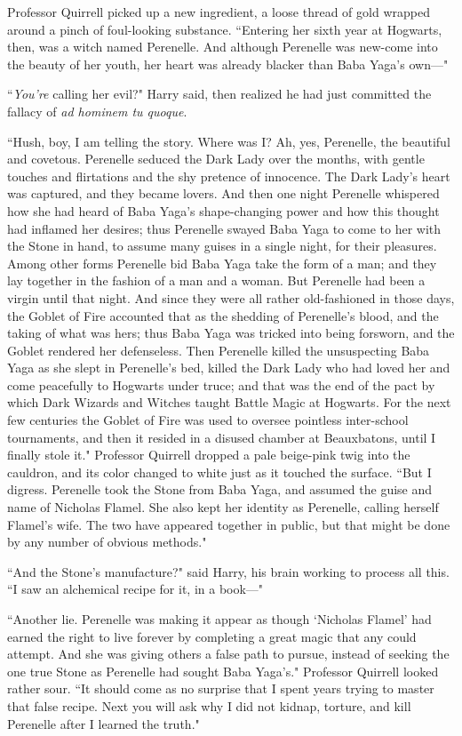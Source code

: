 Professor Quirrell picked up a new ingredient, a loose thread of gold wrapped around a pinch of foul-looking substance. ``Entering her sixth year at Hogwarts, then, was a witch named Perenelle. And although Perenelle was new-come into the beauty of her youth, her heart was already blacker than Baba Yaga's own—"

``\emph{You're} calling her evil?" Harry said, then realized he had just committed the fallacy of \emph{ad hominem tu quoque}.

``Hush, boy, I am telling the story. Where was I? Ah, yes, Perenelle, the beautiful and covetous. Perenelle seduced the Dark Lady over the months, with gentle touches and flirtations and the shy pretence of innocence. The Dark Lady's heart was captured, and they became lovers. And then one night Perenelle whispered how she had heard of Baba Yaga's shape-changing power and how this thought had inflamed her desires; thus Perenelle swayed Baba Yaga to come to her with the Stone in hand, to assume many guises in a single night, for their pleasures. Among other forms Perenelle bid Baba Yaga take the form of a man; and they lay together in the fashion of a man and a woman. But Perenelle had been a virgin until that night. And since they were all rather old-fashioned in those days, the Goblet of Fire accounted that as the shedding of Perenelle's blood, and the taking of what was hers; thus Baba Yaga was tricked into being forsworn, and the Goblet rendered her defenseless. Then Perenelle killed the unsuspecting Baba Yaga as she slept in Perenelle's bed, killed the Dark Lady who had loved her and come peacefully to Hogwarts under truce; and that was the end of the pact by which Dark Wizards and Witches taught Battle Magic at Hogwarts. For the next few centuries the Goblet of Fire was used to oversee pointless inter-school tournaments, and then it resided in a disused chamber at Beauxbatons, until I finally stole it." Professor Quirrell dropped a pale beige-pink twig into the cauldron, and its color changed to white just as it touched the surface. ``But I digress. Perenelle took the Stone from Baba Yaga, and assumed the guise and name of Nicholas Flamel. She also kept her identity as Perenelle, calling herself Flamel's wife. The two have appeared together in public, but that might be done by any number of obvious methods."

``And the Stone's manufacture?" said Harry, his brain working to process all this. ``I saw an alchemical recipe for it, in a book—"

``Another lie. Perenelle was making it appear as though `Nicholas Flamel' had earned the right to live forever by completing a great magic that any could attempt. And she was giving others a false path to pursue, instead of seeking the one true Stone as Perenelle had sought Baba Yaga's." Professor Quirrell looked rather sour. ``It should come as no surprise that I spent years trying to master that false recipe. Next you will ask why I did not kidnap, torture, and kill Perenelle after I learned the truth."

